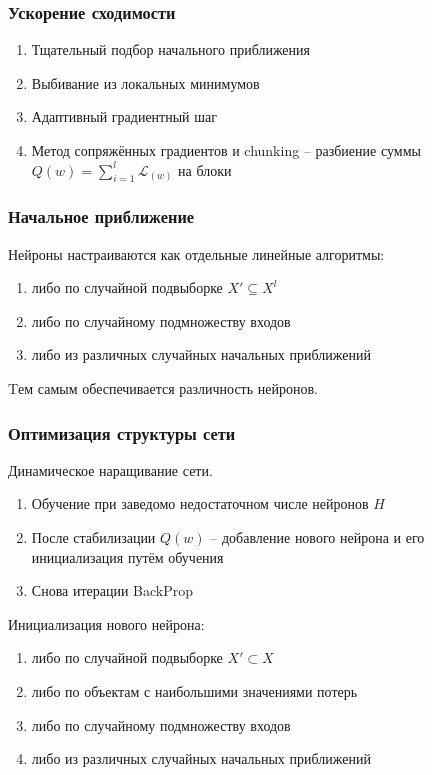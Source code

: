 \documentclass[12pt]{beamer}
\begin{document}
\begin{frame}\frametitle{Ускорение сходимости}
\begin{enumerate}[--]
\item Тщательный подбор начального приближения
\item Выбивание из локальных минимумов
\item Адаптивный градиентный шаг
\item Метод сопряжённых градиентов и chunking -- разбиение суммы $Q(w) = \sum\limits_{i=1}^l \mathcal{L}_(w)$ на блоки
\end{enumerate}
\end{frame}

\begin{frame}\frametitle{Начальное приближение}
Нейроны настраиваются как отдельные линейные алгоритмы:
\begin{enumerate}[--]
\item либо по случайной подвыборке $X' \subseteq X^l$
\item либо по случайному подмножеству входов
\item либо из различных случайных начальных приближений
\end{enumerate}
Tем самым обеспечивается различность нейронов.
\end{frame}


\begin{frame}\frametitle{Оптимизация структуры сети}
Динамическое наращивание сети.\\
\begin{enumerate}[--]
\item Обучение при заведомо недостаточном числе нейронов $H$
\item После стабилизации  $Q(w)$ -- добавление нового нейрона и его инициализация путём обучения
\item Снова итерации BackProp
\end{enumerate}

Инициализация нового нейрона:\\
\begin{enumerate}[--]
\item либо по случайной подвыборке $X' \subset X$
\item либо по объектам с наибольшими значениями потерь
\item либо по случайному подмножеству входов
\item либо из различных случайных начальных приближений
\end{enumerate}

\end{frame}
\end{document}
